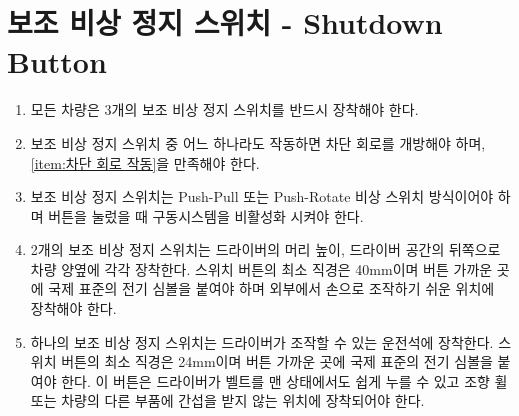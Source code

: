 \documentclass[final,a4paper,10pt]{report}
\begin{document}
\section{보조 비상 정지 스위치 - Shutdown Button}\label{rule:formula-technical.shutdown-button} \label{section:보조 비상 정지 스위치}
\begin{enumerate}
  \item\label{rule:formula-technical.shutdown-button.three-shutdown-buttons} 모든 차량은 3개의 보조 비상 정지 스위치를 반드시 장착해야 한다.
  \item\label{rule:formula-technical.shutdown-button.any-button-opens-sdc} 보조 비상 정지 스위치 중 어느 하나라도 작동하면 차단 회로를 개방해야 하며, \ref{item:차단 회로 작동}을 만족해야 한다.
  \item\label{rule:formula-technical.shutdown-button.push-pull-rotate-type} 보조 비상 정지 스위치는 Push-Pull 또는 Push-Rotate 비상 스위치 방식이어야 하며 버튼을 눌렀을 때 구동시스템을 비활성화 시켜야 한다.
  \item\label{rule:formula-technical.shutdown-button.side-buttons-min-40mm} 2개의 보조 비상 정지 스위치는 드라이버의 머리 높이, 드라이버 공간의 뒤쪽으로 차량 양옆에 각각 장착한다. 스위치 버튼의 최소 직경은 40mm이며 버튼 가까운 곳에 국제 표준의 전기 심볼을 붙여야 하며 외부에서 손으로 조작하기 쉬운 위치에 장착해야 한다.
  \item\label{rule:formula-technical.shutdown-button.cockpit-button-min-24mm} 하나의 보조 비상 정지 스위치는 드라이버가 조작할 수 있는 운전석에 장착한다. 스위치 버튼의 최소 직경은 24mm이며 버튼 가까운 곳에 국제 표준의 전기 심볼을 붙여야 한다. 이 버튼은 드라이버가 벨트를 맨 상태에서도 쉽게 누를 수 있고 조향 휠 또는 차량의 다른 부품에 간섭을 받지 않는 위치에 장착되어야 한다.
\end{enumerate}

\end{document}
